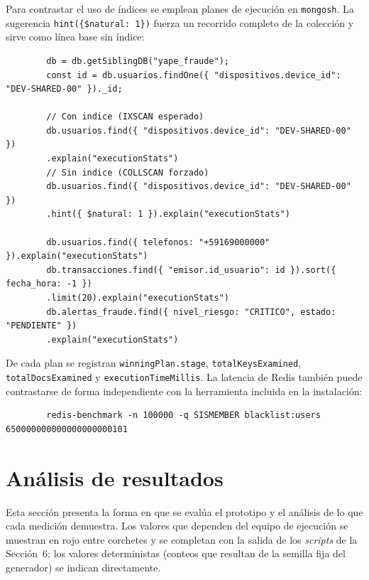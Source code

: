 \documentclass[11pt,a4paper]{article}
\begin{document}
	Para contrastar el uso de índices se emplean planes de ejecución en \texttt{mongosh}. La sugerencia \texttt{hint(\{\$natural: 1\})} fuerza un recorrido completo de la colección y sirve como línea base sin índice:
	\begin{lstlisting}
		db = db.getSiblingDB("yape_fraude");
		const id = db.usuarios.findOne({ "dispositivos.device_id": "DEV-SHARED-00" })._id;
		
		// Con indice (IXSCAN esperado)
		db.usuarios.find({ "dispositivos.device_id": "DEV-SHARED-00" })
		.explain("executionStats")
		// Sin indice (COLLSCAN forzado)
		db.usuarios.find({ "dispositivos.device_id": "DEV-SHARED-00" })
		.hint({ $natural: 1 }).explain("executionStats")
		
		db.usuarios.find({ telefonos: "+59169000000" }).explain("executionStats")
		db.transacciones.find({ "emisor.id_usuario": id }).sort({ fecha_hora: -1 })
		.limit(20).explain("executionStats")
		db.alertas_fraude.find({ nivel_riesgo: "CRITICO", estado: "PENDIENTE" })
		.explain("executionStats")
	\end{lstlisting}
	De cada plan se registran \texttt{winningPlan.stage}, \texttt{totalKeysExamined}, \texttt{totalDocsExamined} y \texttt{executionTimeMillis}. La latencia de Redis también puede contrastarse de forma independiente con la herramienta incluida en la instalación:
	\begin{lstlisting}
		redis-benchmark -n 100000 -q SISMEMBER blacklist:users 650000000000000000000101
	\end{lstlisting}
	
	\section{Análisis de resultados}
	Esta sección presenta la forma en que se evalúa el prototipo y el análisis de lo que cada medición demuestra. Los valores que dependen del equipo de ejecución se muestran en rojo entre corchetes y se completan con la salida de los \textit{scripts} de la Sección~6; los valores deterministas (conteos que resultan de la semilla fija del generador) se indican directamente.
	
\end{document}
